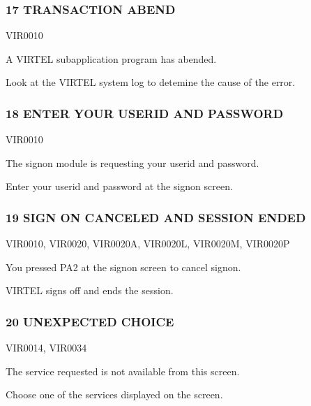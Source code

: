 \documentclass[letterpaper,10pt,english]{sphinxmanual}
\begin{document}
\subsubsection{17 TRANSACTION ABEND}
\label{\detokenize{messages:transaction-abend}}\begin{description}
\sphinxAtStartPar
VIR0010

\sphinxAtStartPar
A VIRTEL subapplication program has abended.

\sphinxAtStartPar
Look at the VIRTEL system log to detemine the cause of the error.

\end{description}


\subsubsection{18 ENTER YOUR USERID AND PASSWORD}
\label{\detokenize{messages:enter-your-userid-and-password}}\begin{description}
\sphinxAtStartPar
VIR0010

\sphinxAtStartPar
The signon module is requesting your userid and password.

\sphinxAtStartPar
Enter your userid and password at the signon screen.

\end{description}


\subsubsection{19 SIGN ON CANCELED AND SESSION ENDED}
\label{\detokenize{messages:sign-on-canceled-and-session-ended}}\begin{description}
\sphinxAtStartPar
VIR0010, VIR0020, VIR0020A, VIR0020L, VIR0020M, VIR0020P

\sphinxAtStartPar
You pressed PA2 at the signon screen to cancel signon.

\sphinxAtStartPar
VIRTEL signs off and ends the session.

\end{description}


\subsubsection{20 UNEXPECTED CHOICE}
\label{\detokenize{messages:unexpected-choice}}\begin{description}
\sphinxAtStartPar
VIR0014, VIR0034

\sphinxAtStartPar
The service requested is not available from this screen.

\sphinxAtStartPar
Choose one of the services displayed on the screen.

\end{description}
\end{document}
